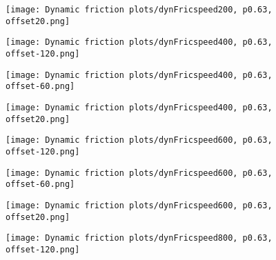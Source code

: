 \documentclass[12pt]{article}
\begin{document}
\begin{figure}[!h]
    \centering
    \begin{minipage}{0.49\textwidth}       
         \texttt{[image: Dynamic friction plots/dynFricspeed200, p0.63, offset20.png]}
    \end{minipage}
    \begin{minipage}{0.49\textwidth}       
         \texttt{[image: Dynamic friction plots/dynFricspeed400, p0.63, offset-120.png]}
    \end{minipage}

\end{figure}

\begin{figure}[!h]
    \centering
    \begin{minipage}{0.49\textwidth}       
         \texttt{[image: Dynamic friction plots/dynFricspeed400, p0.63, offset-60.png]}
    \end{minipage}
    \begin{minipage}{0.49\textwidth}       
         \texttt{[image: Dynamic friction plots/dynFricspeed400, p0.63, offset20.png]}
    \end{minipage}

\end{figure}
\begin{figure}[!h]
    \centering
    \begin{minipage}{0.49\textwidth}       
         \texttt{[image: Dynamic friction plots/dynFricspeed600, p0.63, offset-120.png]}
    \end{minipage}
    \begin{minipage}{0.49\textwidth}       
         \texttt{[image: Dynamic friction plots/dynFricspeed600, p0.63, offset-60.png]}
    \end{minipage}

\end{figure}
\begin{figure}[!h]
    \centering
    \begin{minipage}{0.49\textwidth}       
         \texttt{[image: Dynamic friction plots/dynFricspeed600, p0.63, offset20.png]}
    \end{minipage}
    \begin{minipage}{0.49\textwidth}       
         \texttt{[image: Dynamic friction plots/dynFricspeed800, p0.63, offset-120.png]}
    \end{minipage}

\end{figure}
\end{document}
